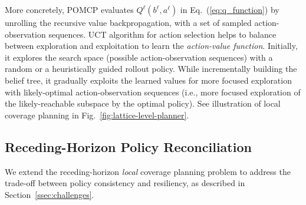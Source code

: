 \documentclass[letterpaper]{article} %
\newcommand{\phdone}[1]{} %
\begin{document}
\phdone{POMCP Details}
More concretely, POMCP evaluates $Q^\ell(b^\ell, a^\ell)$ in Eq.~(\ref{eq:q_function}) by unrolling the recursive value backpropagation, with a set of sampled action-observation sequences.
UCT algorithm for action selection helps to balance between exploration and exploitation to learn the \textit{action-value function}.
Initially, it explores the search space (possible action-observation sequences) with a random or a heuristically guided rollout policy.
While incrementally building the belief tree, it gradually exploits the learned values for more focused exploration with likely-optimal action-observation sequences (i.e., more focused exploration of the likely-reachable subspace by the optimal policy).
See illustration of local coverage planning in Fig.~\ref{fig:lattice-level-planner}.




\subsection{Receding-Horizon Policy Reconciliation} \label{ssec:resilient_rhp}

\phdone{Consistency and Resiliency}
We extend the receding-horizon \textit{local} coverage planning problem to address the trade-off between policy consistency and resiliency, as described in Section~\ref{ssec:challenges}.

\end{document}
